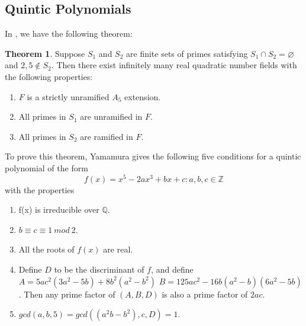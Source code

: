 \documentclass[12pt]{extarticle}
\newcommand{\Q}{\mathbb{Q}}
\newcommand{\<}{\langle}
\renewcommand{\>}{\rangle}
\renewcommand{\emptyset}{\varnothing}
\theoremstyle{definition}
\newtheorem{theorem}{Theorem}
\begin{document}
\subsection{Quintic Polynomials}
In \cite{YAMAMURA2}, we have the following theorem:
\begin{theorem}
    Suppose $S_1$ and $S_2$ are finite sets of primes satisfying $S_1 \cap S_2 = \emptyset$ and $2,5 \notin S_2$. Then there exist infinitely many real quadratic number fields with the following properties: \begin{enumerate}
        \item $F$ is a strictly unramified $A_5$ extension.
        \item All primes in $S_1$ are unramified in $F$.
        \item All primes in $S_2$ are ramified in $F$.
    \end{enumerate}
\end{theorem}
To prove this theorem, Yamamura gives the following five conditions for a quintic polynomial of the form \begin{equation}
    f(x)=x^5-2ax^3+bx+c:  a,b,c \in \mathbb{Z}
\end{equation} with the properties
\begin{enumerate}
\item f(x) is irreducible over $\Q$.
\item $b \equiv c \equiv 1 \: mod \: 2  $.
\item All the roots of $f(x)$ are real.
\item Define $D$ to be the discriminant of $f$, and define
$A= 5ac^2(3a^2-5b)+8b^2(a^2-b^2)$
$B = 125ac^2-16b(a^2-b)(6a^2-5b)$.
Then any prime factor of $(A,B,D)$ is also a prime factor of $2ac$. 

\item $gcd(a,b,5) =gcd((a^2b-b^2),c,D)=1$.{}

\end{enumerate} 
\end{document}
